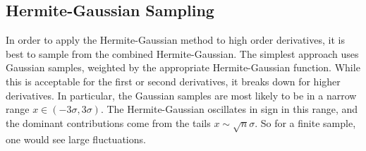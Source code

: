 \subsection{Hermite-Gaussian Sampling}

In order to apply the Hermite-Gaussian method to high order derivatives, it is best to 
sample from the combined Hermite-Gaussian.  The simplest approach uses Gaussian samples, weighted
by the appropriate Hermite-Gaussian function.  While this is acceptable for the first or second derivatives,
it breaks down for higher derivatives.  In particular, the Gaussian samples are most likely to be in a narrow
range $x\in(-3\sigma,3\sigma)$.  The Hermite-Gaussian oscillates in sign in this range, and
the dominant contributions come from the tails $x\sim \sqrt{n}\sigma$.  So for a finite sample,
one would see large fluctuations.  


